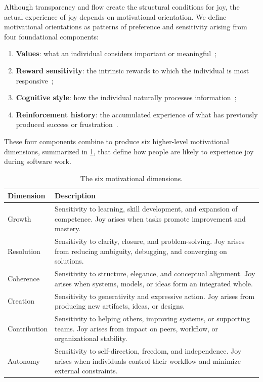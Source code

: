 \documentclass[12pt]{elsarticle}
\begin{document}
Although transparency and flow create the structural conditions for joy, 
the actual experience of joy depends on motivational orientation. We 
define motivational orientations as patterns of preference and 
sensitivity arising from four foundational components:
%
\begin{enumerate}
    \item \textbf{Values}: what an individual considers important or 
          meaningful~\cite{schwartz1992};
    \item \textbf{Reward sensitivity}: the intrinsic rewards to which 
          the individual is most responsive~\cite{deci2013};
    \item \textbf{Cognitive style}: how the individual naturally 
          processes information~\cite{kozhevnikov2007};
    \item \textbf{Reinforcement history}: the accumulated experience of 
          what has previously produced success or 
          frustration~\cite{anderson2000}.
\end{enumerate}
%
These four components combine to produce six higher-level motivational 
dimensions, summarized in \cref{tab:dimensions}, that define how people 
are likely to experience joy during software work.

\begin{table}[htbp]
\caption{The six motivational dimensions.}
\label{tab:dimensions}
\centering
\begin{tabularx}{\linewidth}{lX}
\toprule
\textbf{Dimension} & \textbf{Description} \\
\midrule
Growth       & Sensitivity to learning, skill development, and expansion 
               of competence. Joy arises when tasks promote improvement 
               and mastery. \\
\addlinespace
Resolution   & Sensitivity to clarity, closure, and problem-solving. 
               Joy arises from reducing ambiguity, debugging, and 
               converging on solutions. \\
\addlinespace
Coherence    & Sensitivity to structure, elegance, and conceptual 
               alignment. Joy arises when systems, models, or ideas form 
               an integrated whole. \\
\addlinespace
Creation     & Sensitivity to generativity and expressive action. Joy 
               arises from producing new artifacts, ideas, or designs. \\
\addlinespace
Contribution & Sensitivity to helping others, improving systems, or 
               supporting teams. Joy arises from impact on peers, 
               workflow, or organizational stability. \\
\addlinespace
Autonomy     & Sensitivity to self-direction, freedom, and independence. 
               Joy arises when individuals control their workflow and 
               minimize external constraints. \\
\bottomrule
\end{tabularx}
\end{table}
\end{document}
